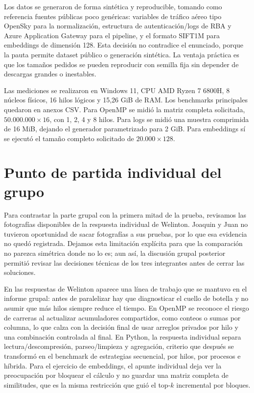 \documentclass[letterpaper,11pt]{article}
\begin{document}
Los datos se generaron de forma sintética y reproducible, tomando como referencia fuentes públicas poco genéricas: variables de tráfico aéreo tipo OpenSky para la normalización, estructura de autenticación/logs de RBA y Azure Application Gateway para el pipeline, y el formato SIFT1M para embeddings de dimensión 128. Esta decisión no contradice el enunciado, porque la pauta permite dataset público o generación sintética. La ventaja práctica es que los tamaños pedidos se pueden reproducir con semilla fija sin depender de descargas grandes o inestables.

Las mediciones se realizaron en Windows 11, CPU AMD Ryzen 7 6800H, 8 núcleos físicos, 16 hilos lógicos y 15,26 GiB de RAM. Los benchmarks principales quedaron en anexos CSV. Para OpenMP se midió la matriz completa solicitada, \(50.000.000 \times 16\), con 1, 2, 4 y 8 hilos. Para logs se midió una muestra comprimida de 16 MiB, dejando el generador parametrizado para 2 GiB. Para embeddings sí se ejecutó el tamaño completo solicitado de \(20.000 \times 128\).

\section*{Punto de partida individual del grupo}

Para contrastar la parte grupal con la primera mitad de la prueba, revisamos las fotografías disponibles de la respuesta individual de Welinton. Joaquin y Juan no tuvieron oportunidad de sacar fotografías a sus pruebas, por lo que esa evidencia no quedó registrada. Dejamos esta limitación explícita para que la comparación no parezca simétrica donde no lo es; aun así, la discusión grupal posterior permitió revisar las decisiones técnicas de los tres integrantes antes de cerrar las soluciones.

En las respuestas de Welinton aparece una línea de trabajo que se mantuvo en el informe grupal: antes de paralelizar hay que diagnosticar el cuello de botella y no asumir que más hilos siempre reduce el tiempo. En OpenMP se reconoce el riesgo de carreras al actualizar acumuladores compartidos, como conteos o sumas por columna, lo que calza con la decisión final de usar arreglos privados por hilo y una combinación controlada al final. En Python, la respuesta individual separa lectura/descompresión, parseo/limpieza y agregación, criterio que después se transformó en el benchmark de estrategias secuencial, por hilos, por procesos e híbrida. Para el ejercicio de embeddings, el apunte individual deja ver la preocupación por bloquear el cálculo y no guardar una matriz completa de similitudes, que es la misma restricción que guió el top-\(k\) incremental por bloques.
\end{document}

